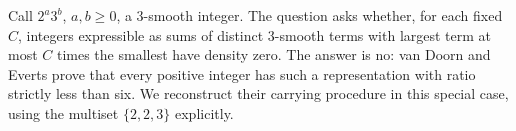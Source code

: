 Call $2^a3^b$, $a,b\ge0$, a 3-smooth integer. The question asks whether, for each fixed $C$, integers expressible as sums of distinct 3-smooth terms with largest term at most $C$ times the smallest have density zero. The answer is no: van Doorn and Everts prove that every positive integer has such a representation with ratio strictly less than six. We reconstruct their carrying procedure in this special case, using the multiset $\{2,2,3\}$ explicitly.
